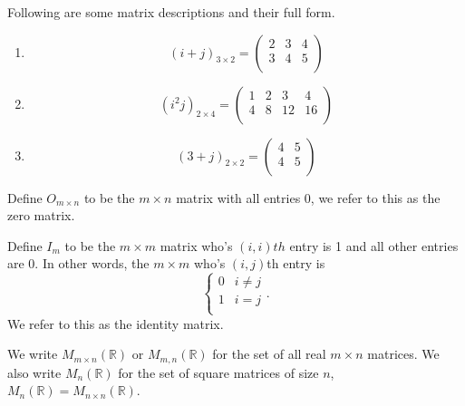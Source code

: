 \begin{example}
    Following are some matrix descriptions and their full form.
    \begin{enumerate}
        \item
        \[
            (i+j)_{3\times2}=
            \begin{pmatrix}
                2&3&4\\3&4&5\\
            \end{pmatrix}
        \]
        
        \item 
        \[
            (i^2j)_{2\times4}=
            \begin{pmatrix}
                1&2&3&4\\4&8&12&16\\
            \end{pmatrix}
        \]
        
        \item
        \[
            (3+j)_{2\times 2}=
            \begin{pmatrix}
                4&5\\4&5\\
            \end{pmatrix}
        \]
    \end{enumerate}
\end{example}

\begin{definition}
    Define $O_{m\times n}$ to be the $m\times n$ matrix with all entries $0$, we refer to this as the zero matrix.
\end{definition}

\begin{definition}
    Define $I_m$ to be the $m\times m$ matrix who's $(i,i)th$ entry is 1 and all other entries are 0. In other words, the $m\times m$ who's $(i,j)$th entry is
    \[
        \begin{cases}
            0&i\neq j\\
            1&i=j\\
        \end{cases}.
    \]
    We refer to this as the identity matrix.
\end{definition}

We write $M_{m\times n}(\mathbb R)$ or $M_{m,n}(\mathbb R)$ for the set of all real $m\times n$ matrices. We also write $M_n(\mathbb R)$ for the set of square matrices of size $n$, $M_n(\mathbb R)=M_{n\times n}(\mathbb R)$.

